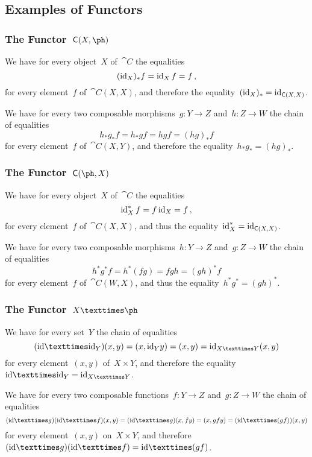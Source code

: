 \subsection{Examples of Functors}



\subsubsection{The Functor~$\cat{C}(X, \ph)$}

We have for every object~$X$ of~$\cat{C}$ the equalities
\[
	(\operatorname{id}_X)_* f = \operatorname{id}_X f = f \,,
\]
for every element~$f$ of~$\cat{C}(X, X)$, and therefore the equality~$(\operatorname{id}_X)_* = \operatorname{id}_{\mathsf{C}(X, X)}$.

We have for every two composable morphisms~$g \colon Y \to Z$ and~$h \colon Z \to W$ the chain of equalities
\[
	h_* g_* f
	=
	h_* g f
	=
	h g f
	=
	(h g)_* f
\]
for every element~$f$ of~$\cat{C}(X, Y)$, and therefore the equality~$h_* g_* = (h g)_*$.



\subsubsection{The Functor~$\cat{C}(\ph, X)$}

We have for every object~$X$ of~$\cat{C}$ the equalities
\[
	\operatorname{id}_X^* f = f \operatorname{id}_X = f \,,
\]
for every element~$f$ of~$\cat{C}(X, X)$, and thus the equality~$\operatorname{id}_X^* = \operatorname{id}_{\mathsf{C}(X, X)}$.

We have for every two composable morphisms~$h \colon Y \to Z$ and~$g \colon Z \to W$ the chain of equalities
\[
	h^* g^* f
	=
	h^* (f g)
	=
	f g h
	=
	(g h)^* f
\]
for every element~$f$ of~$\cat{C}(W, X)$, and thus the equality~$h^* g^* = (g h)^*$.



\subsubsection{The Functor~$X × \ph$}

We have for every set~$Y$ the chain of equalities
\[
	({\id} × {\id_Y})(x, y)
	=
	(x, {\id_Y} y)
	=
	(x, y)
	=
	\id_{X × Y} (x, y)
\]
for every element~$(x, y)$ of~$X × Y$, and therefore the equality~${\id} × {\id_Y} = \id_{X × Y}$.

We have for every two composable functions~$f \colon Y \to Z$ and~$g \colon Z \to W$ the chain of equalities
\[
	({\id} × g) ({\id} × f) (x, y)
	=
	({\id} × g) (x, f y)
	=
	(x, g f y)
	=
	({\id} × (g f)) (x, y)
\]
for every element~$(x, y)$ on~$X × Y$, and therefore~$({\id} × g) ({\id} × f) = {\id} × (g f)$.



